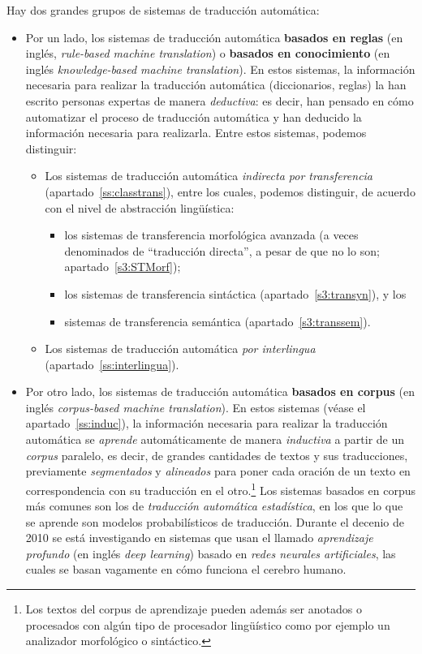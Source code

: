 Hay dos grandes grupos de sistemas de traducción automática: \begin{itemize} \item Por un lado, los sistemas de traducción automática \textbf{basados en reglas} (en inglés, \emph{rule-based machine translation}) o \textbf{basados en conocimiento} (en inglés \emph{knowledge-based machine translation}). En estos sistemas, la información necesaria para realizar la traducción automática (diccionarios, reglas) la han escrito personas expertas de manera \emph{deductiva}: es decir, han pensado en cómo automatizar el proceso de traducción automática y  han deducido la información necesaria para realizarla. Entre estos sistemas, podemos distinguir: \begin{itemize} \item Los sistemas de traducción automática \emph{indirecta por transferencia} (apartado~\ref{ss:classtrans}), entre los cuales, podemos distinguir, de acuerdo con el nivel de abstracción lingüística: \begin{itemize} \item los sistemas de transferencia morfológica avanzada (a veces denominados de ``traducción directa'', a pesar de que no lo son; apartado~\ref{s3:STMorf}); \item los sistemas de transferencia sintáctica (apartado~\ref{s3:transyn}), y los \item sistemas de transferencia semántica (apartado~\ref{s3:transsem}). \end{itemize} \item Los sistemas de traducción automática \emph{por interlingua} (apartado~\ref{ss:interlingua}). \end{itemize} \item Por otro lado, los sistemas de traducción automática \textbf{basados en corpus} (en inglés \emph{corpus-based machine translation}). En estos sistemas (véase el apartado~\ref{ss:induc}), la información necesaria para realizar la traducción automática se \emph{aprende} automáticamente de manera \emph{inductiva} a partir de un \emph{corpus} paralelo, es decir, de grandes cantidades de textos y sus traducciones, previamente \emph{segmentados} y \emph{alineados} para poner cada oración de un texto en correspondencia con su traducción en el otro.\footnote{Los textos del corpus de aprendizaje pueden además ser anotados o procesados con algún tipo de procesador lingüístico como por ejemplo un analizador morfológico o sintáctico.} Los sistemas basados en corpus más comunes son los de \emph{traducción automática estadística}, en los que lo que se aprende son modelos probabilísticos de traducción. Durante el decenio de 2010 se está investigando en sistemas que usan el llamado \emph{aprendizaje profundo} (en inglés \emph{deep learning}) basado en \emph{redes neurales artificiales}, las cuales se basan vagamente en cómo funciona el cerebro humano. \end{itemize} 

